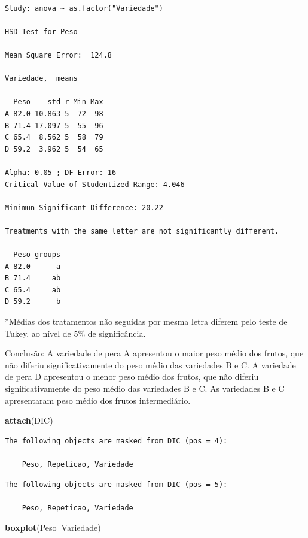 \documentclass[12pt,brazil,oneside]{book}
\newenvironment{Shaded}{\begin{snugshade}}{\end{snugshade}}
\newcommand{\KeywordTok}[1]{\textcolor[rgb]{0.13,0.29,0.53}{\textbf{#1}}}
\newcommand{\NormalTok}[1]{#1}
\newcommand{\OperatorTok}[1]{\textcolor[rgb]{0.81,0.36,0.00}{\textbf{#1}}}
\begin{document}
\begin{verbatim}

Study: anova ~ as.factor("Variedade")

HSD Test for Peso 

Mean Square Error:  124.8 

Variedade,  means

  Peso    std r Min Max
A 82.0 10.863 5  72  98
B 71.4 17.097 5  55  96
C 65.4  8.562 5  58  79
D 59.2  3.962 5  54  65

Alpha: 0.05 ; DF Error: 16 
Critical Value of Studentized Range: 4.046 

Minimun Significant Difference: 20.22 

Treatments with the same letter are not significantly different.

  Peso groups
A 82.0      a
B 71.4     ab
C 65.4     ab
D 59.2      b
\end{verbatim}

*Médias dos tratamentos não seguidas por mesma letra diferem pelo teste de Tukey, ao nível de 5\% de significância.

Conclusão: A variedade de pera A apresentou o maior peso médio dos frutos, que não diferiu significativamente do peso médio das variedades B e C. A variedade de pera D apresentou o menor peso médio dos frutos, que não diferiu significativamente do peso médio das variedades B e C. As variedades B e C apresentaram peso médio dos frutos intermediário.

\begin{Shaded}
\begin{Highlighting}[]
\KeywordTok{attach}\NormalTok{(DIC)}
\end{Highlighting}
\end{Shaded}

\begin{verbatim}
The following objects are masked from DIC (pos = 4):

    Peso, Repeticao, Variedade
\end{verbatim}

\begin{verbatim}
The following objects are masked from DIC (pos = 5):

    Peso, Repeticao, Variedade
\end{verbatim}

\begin{Shaded}
\begin{Highlighting}[]
\KeywordTok{boxplot}\NormalTok{(Peso}\OperatorTok{~}\NormalTok{Variedade)}
\end{Highlighting}
\end{Shaded}
\end{document}
